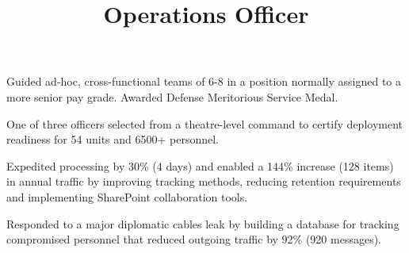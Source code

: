 \documentclass[line]{res}
\begin{document}
\begin{resume}
\title{\bf Operations Officer}
\begin{position}
\vspace*{-.2cm}
\begin{list2}
	\item Guided ad-hoc, cross-functional teams of 6-8 in a position normally assigned to a more senior pay grade. Awarded Defense Meritorious Service Medal.
	\item One of three officers selected from a theatre-level command to certify deployment readiness for 54 units and 6500+ personnel.
	\item Expedited processing by 30\% (4 days) and enabled a 144\% increase (128 items) in annual traffic by improving tracking methods, reducing retention requirements and implementing SharePoint collaboration tools.
	\item Responded to a major diplomatic cables leak by building a database for tracking compromised personnel that reduced outgoing traffic by 92\% (920 messages).	
\end{list2}
\end{position}


\end{resume}
\end{document}
